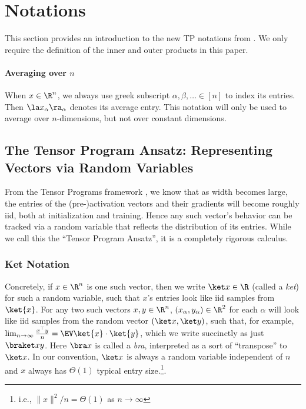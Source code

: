 
\section{Notations}
\label{sec:notations}

This section provides an introduction to the new TP notations from \cite{yang2023tensor}. We only require the definition of the inner and outer products in this paper. 

\paragraph{Averaging over $n$}
When $x \in \R^n$, we always use greek subscript $\alpha, \beta, \ldots \in [n]$ to index its entries.
Then $\la x_\alpha \ra_\alpha$ denotes its average entry.
This notation will only be used to average over $n$-dimensions, but not over constant dimensions.

\subsection{The Tensor Program Ansatz: Representing Vectors via Random Variables}
\label{sec:TPansatz}

From the Tensor Programs framework \citep{yang2022tensor}, we know that as width becomes large, the entries of the (pre-)activation
vectors and their gradients will become roughly iid, both at initialization and training. Hence any such vector's behavior can be
tracked via a random variable that reflects the distribution of its
entries. While we call this the ``Tensor Program Ansatz'', it is a completely rigorous calculus.

\subsubsection{Ket Notation}

Concretely, if $x\in\R^{n}$ is one such vector, then we write $\ket x \in \R$ (called a \emph{ket})
for such a random variable, such that $x$'s entries look like iid
samples from $\ket{x}$.%
For any two such vectors $x, y \in \R^n$, $(x_\alpha, y_\alpha) \in \R^2$ for each $\alpha$ will look like iid samples from the random vector $(\ket x, \ket y)$, such that, for example, $\lim_{n\to\infty}\frac{x^{\top}y}{n}=\EV \ket{x}\cdot \ket{y}$, which we write succinctly as just $\braket x y$.
Here $\bra x$ is called a \emph{bra}, interpreted as a sort of ``transpose'' to $\ket x$.
In our convention, $\ket x$ is always a random variable independent of $n$ and $x$ always has $\Theta(1)$ typical entry size.\footnote{i.e., $\|x\|^{2}/n=\Theta(1)$ as $n\to\infty$}.

